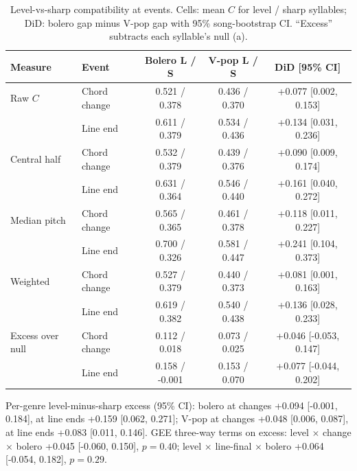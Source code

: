 \documentclass[11pt]{article}
\begin{document}
\begin{table}[H]\centering\caption{Level-vs-sharp compatibility at events. Cells: mean $C$ for level / sharp syllables; DiD: bolero gap minus V-pop gap with 95\% song-bootstrap CI. ``Excess'' subtracts each syllable's null (a).}\small
\begin{tabular}{llccc}\toprule Measure & Event & Bolero L / S & V-pop L / S & DiD [95\% CI]\\\midrule
Raw $C$ & Chord change & 0.521 / 0.378 & 0.436 / 0.370 & +0.077 [0.002, 0.153]\\
 & Line end & 0.611 / 0.379 & 0.534 / 0.436 & +0.134 [0.031, 0.236]\\
Central half & Chord change & 0.532 / 0.379 & 0.439 / 0.376 & +0.090 [0.009, 0.174]\\
 & Line end & 0.631 / 0.364 & 0.546 / 0.440 & +0.161 [0.040, 0.272]\\
Median pitch & Chord change & 0.565 / 0.365 & 0.461 / 0.378 & +0.118 [0.011, 0.227]\\
 & Line end & 0.700 / 0.326 & 0.581 / 0.447 & +0.241 [0.104, 0.373]\\
Weighted & Chord change & 0.527 / 0.379 & 0.440 / 0.373 & +0.081 [0.001, 0.163]\\
 & Line end & 0.619 / 0.382 & 0.540 / 0.438 & +0.136 [0.028, 0.233]\\
Excess over null & Chord change & 0.112 / 0.018 & 0.073 / 0.025 & +0.046 [-0.053, 0.147]\\
 & Line end & 0.158 / -0.001 & 0.153 / 0.070 & +0.077 [-0.044, 0.202]\\
\bottomrule\end{tabular}\end{table}
Per-genre level-minus-sharp excess (95\% CI): bolero at changes +0.094 [-0.001, 0.184], at line ends +0.159 [0.062, 0.271]; V-pop at changes +0.048 [0.006, 0.087], at line ends +0.083 [0.011, 0.146]. GEE three-way terms on excess: level $\times$ change $\times$ bolero +0.045 [-0.060, 0.150], $p=0.40$; level $\times$ line-final $\times$ bolero +0.064 [-0.054, 0.182], $p=0.29$.
\end{document}

